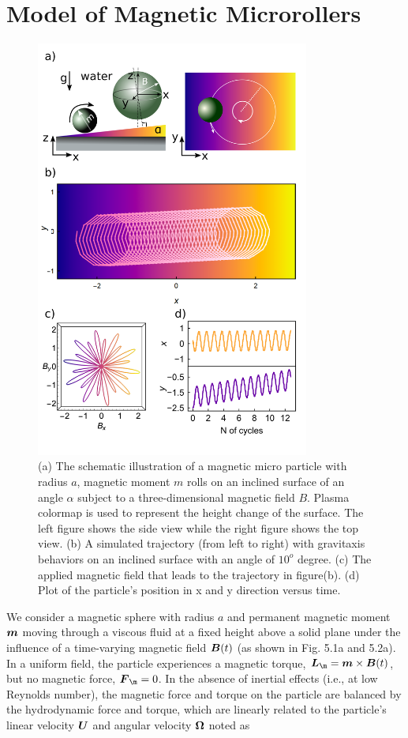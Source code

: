 \section{Model of  Magnetic Microrollers}
\begin{figure}[p]
\centering
\includegraphics[width=9cm]{figures/5_1.png}
\caption{ (a) The schematic illustration of a magnetic micro particle with radius $a$, magnetic moment $m$ rolls on an inclined surface of an angle  $\alpha$ subject to a three-dimensional magnetic field $B$. Plasma colormap is used to represent the height change of the surface. The left figure shows the side view while the right figure shows the top view. (b) A simulated trajectory (from left to right) with gravitaxis behaviors on an inclined surface with an angle of $10^o$ degree. (c) The applied magnetic field that leads to the trajectory in figure(b). (d) Plot of the particle's position in x and y direction versus time.}
\label{fig:5.1}
\end{figure}
We consider a magnetic sphere with radius $a$ and permanent magnetic moment $\boldsymbol{m}$ moving through a viscous fluid at a fixed height above a solid plane under the influence of a time-varying magnetic field $\boldsymbol{B}(t)$ (as shown in Fig. 5.1a and 5.2a). In a uniform field, the particle experiences a magnetic torque, $\ve{L}_{\m}=\ve{m}\times\ve{B}(t)$, but no magnetic force, $\ve{F}_{\m}=0$. In the absence of inertial effects (i.e., at low Reynolds number), the magnetic force and torque on the particle are balanced by the hydrodynamic force and torque, which are linearly related to the particle's linear velocity $\boldsymbol{U}$ and angular velocity $\boldsymbol{\Omega}$ noted as
